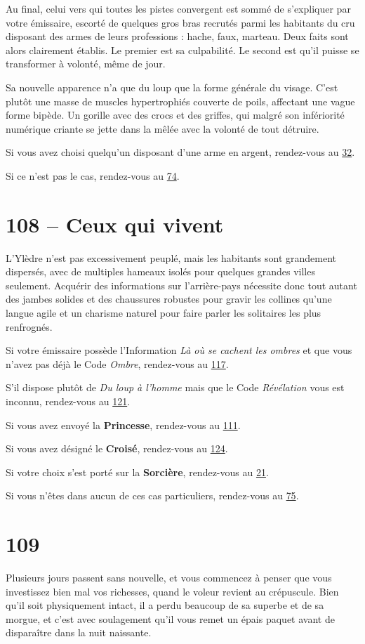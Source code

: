 \documentclass{report}
\newcommand{\gsection}[1]{
    \section{#1}
    \label{section-#1}
}
\newcommand{\glink}[1]{\hyperref[section-#1]{#1}}
\newcommand{\hero}[1]{\textbf{#1}}
\begin{document}
Au final, celui vers qui toutes les pistes convergent est sommé de s'expliquer par votre émissaire, escorté de quelques gros bras recrutés parmi les habitants du cru disposant des armes de leurs professions : hache, faux, marteau. Deux faits sont alors clairement établis. Le premier est sa culpabilité. Le second est qu'il puisse se transformer à volonté, même de jour.

Sa nouvelle apparence n'a que du loup que la forme générale du visage. C'est plutôt une masse de muscles hypertrophiés couverte de poils, affectant une vague forme bipède. Un gorille avec des crocs et des griffes, qui malgré son infériorité numérique criante se jette dans la mêlée avec la volonté de tout détruire.

Si vous avez choisi quelqu'un disposant d'une arme en argent, rendez-vous au \glink{32}.

Si ce n'est pas le cas, rendez-vous au \glink{74}.

\gsection{108 – Ceux qui vivent}

L'Ylèdre n'est pas excessivement peuplé, mais les habitants sont grandement dispersés, avec de multiples hameaux isolés pour quelques grandes villes seulement. Acquérir des informations sur l'arrière-pays nécessite donc tout autant des jambes solides et des chaussures robustes pour gravir les collines qu'une langue agile et un charisme naturel pour faire parler les solitaires les plus renfrognés.

Si votre émissaire possède l'Information \emph{Là où se cachent les ombres} et que vous n'avez pas déjà le Code \emph{Ombre}, rendez-vous au \glink{117}.

S'il dispose plutôt de \emph{Du loup à l'homme} mais que le Code \emph{Révélation} vous est inconnu, rendez-vous au \glink{121}.

Si vous avez envoyé la \hero{Princesse}, rendez-vous au \glink{111}.

Si vous avez désigné le \hero{Croisé}, rendez-vous au \glink{124}.

Si votre choix s'est porté sur la \hero{Sorcière}, rendez-vous au \glink{21}.

Si vous n'êtes dans aucun de ces cas particuliers, rendez-vous au \glink{75}.

\gsection{109}

Plusieurs jours passent sans nouvelle, et vous commencez à penser que vous investissez bien mal vos richesses, quand le voleur revient au crépuscule. Bien qu'il soit physiquement intact, il a perdu beaucoup de sa superbe et de sa morgue, et c'est avec soulagement qu'il vous remet un épais paquet avant de disparaître dans la nuit naissante.
\end{document}
